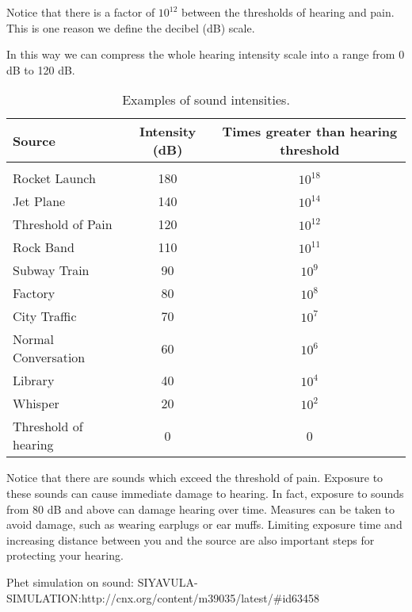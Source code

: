 Notice that there is a factor of $10^{12}$ between the thresholds of
hearing and pain. This is one reason we define the decibel (dB) scale.


In this way we can compress the whole hearing intensity scale into a
range from 0 dB to 120 dB.

\begin{table}[H]
\begin{center}
\caption{Examples of sound intensities.}
\label{p:wsl:s11:intensity}
\begin{tabular}{|l|c|c|}\hline
\textbf{Source}&\textbf{Intensity} (dB) & \textbf{Times greater than hearing threshold}\\\hline
& & \\
Rocket Launch &180 & $10^{18}$\\
Jet Plane & 140 & $10^{14}$ \\
Threshold of Pain & 120 & $10^{12}$\\
Rock Band & 110 & $10^{11}$\\
Subway Train & 90 & $10^{9}$\\
Factory & 80 & $10^{8}$\\
City Traffic & 70 & $10^{7}$\\
Normal Conversation & 60 & $10^{6}$\\
Library & 40 & $10^{4}$\\
Whisper & 20 & $10^{2}$\\
Threshold of hearing & 0 & 0\\
\hline
\end{tabular}
\end{center}
\end{table}

Notice that there are sounds which exceed the threshold
of pain. Exposure to these sounds can cause immediate damage to hearing.
In fact, exposure to sounds from
80 dB and above can damage hearing over time. Measures
can be taken to avoid damage, such as wearing earplugs
or ear muffs. Limiting exposure time and
increasing distance between you and the source are also
important steps for protecting your hearing.

Phet simulation on sound: SIYAVULA-SIMULATION:http://cnx.org/content/m39035/latest/#id63458

